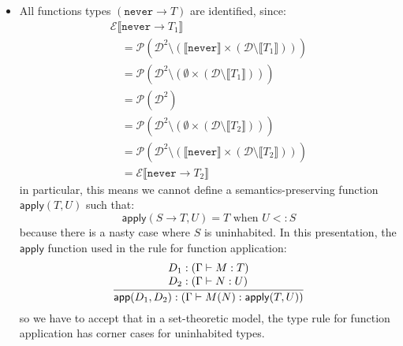 \documentclass[acmsmall,review,screen]{acmart}
\makeatletter
\newcommand{\infer}[2]{\frac{\displaystyle\begin{array}{@{}l@{}}#1\end{array}}{\displaystyle#2}}
\newcommand{\NEVER}{\mathtt{never}}
\newcommand{\APPLY}{\mathsf{apply}}
\newcommand{\APP}{\mathsf{app}}
\newcommand{\fun}{\mathbin{\rightarrow}}
\newcommand{\sem}[1]{\llbracket{#1}\rrbracket}
\newcommand{\Val}{\mathcal{D}}
\makeatother
\begin{document}
\begin{itemize}
  
\item All functions types $(\NEVER \fun T)$ are identified, since:
  \[\begin{array}{l}
    \mathcal{E}\sem{\NEVER \fun T_1} \\\quad
     = \mathcal{P}(\Val^2 \setminus (\sem{\NEVER} \times (\Val \setminus \sem{T_1}))) \\\quad
     = \mathcal{P}(\Val^2 \setminus (\emptyset \times (\Val \setminus \sem{T_1}))) \\\quad
     = \mathcal{P}(\Val^2) \\\quad
     = \mathcal{P}(\Val^2 \setminus (\emptyset \times (\Val \setminus \sem{T_2}))) \\\quad
     = \mathcal{P}(\Val^2 \setminus (\sem{\NEVER} \times (\Val \setminus \sem{T_2}))) \\\quad
     = \mathcal{E}\sem{\NEVER \fun T_2}
  \end{array}\]
  in particular, this means we cannot define a semantics-preserving function
  $\APPLY(T, U)$ such that:
  \[
    \APPLY(S \fun T, U) = T \mbox{ when } U <: S
  \]
  because there is a nasty case where $S$ is uninhabited. In this presentation,
  the $\APPLY$ function used in the rule for function application:
  \[
    \infer{
      D_1 : (\Gamma \vdash M : T) \\
      D_2 : (\Gamma \vdash N : U)
    }{
      \APP(D_1, D_2) : (\Gamma \vdash M(N) : \APPLY(T,U))
    }
  \]
  so we have to accept that in a set-theoretic model, the type rule for function
  application has corner cases for uninhabited types.


\end{itemize}
\end{document}
